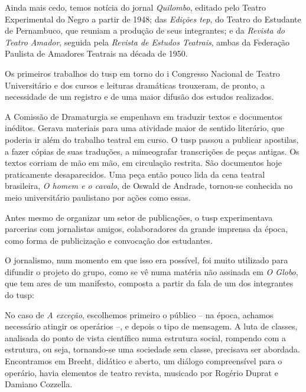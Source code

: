 Ainda mais cedo, temos notícia do jornal {\it Quilombo}, editado pelo
Teatro Experimental do Negro a partir de 1948; das {\it Edições {\sc tep}}, do
Teatro do Estudante de Pernambuco, que reuniam a produção de seus
integrantes; e da {\it Revista do Teatro Amador}, seguida pela
{\it Revista de Estudos Teatrais}, ambas da Federação Paulista de
Amadores Teatrais na década de 1950.

Os primeiros trabalhos do {\sc tusp} em torno do {\sc i} Congresso Nacional de
Teatro Universitário e dos cursos e leituras dramáticas trouxeram, de
pronto, a necessidade de um registro e de uma maior difusão dos estudos
realizados.

A Comissão de Dramaturgia se empenhava em traduzir textos e
documentos inéditos. Gerava materiais para uma atividade maior de
sentido literário, que poderia ir além do trabalho teatral em curso. O
{\sc tusp} passou a publicar apostilas, a fazer cópias de suas traduções, a
mimeografar transcrições de peças antigas. Os textos corriam de mão
em mão, em circulação restrita. São documentos hoje praticamente
desaparecidos. Uma peça então pouco lida da cena teatral brasileira,
{\it O homem e o cavalo}, de Oswald de Andrade, tornou-se conhecida no
meio universitário paulistano por ações como essas.


Antes mesmo de organizar um setor de publicações, o {\sc tusp}
experimentava parcerias com jornalistas amigos, colaboradores da grande
imprensa da época, como forma de publicização e convocação dos
estudantes.

O jornalismo, num momento em que isso era possível, foi muito utilizado
para difundir o projeto do grupo, como se vê numa matéria não assinada
em {\it O Globo}, que tem ares de um manifesto, composta a partir da
fala de um dos integrantes do {\sc tusp}:

\startblockquote
No caso de {\it A exceção}, escolhemos primeiro o público -- na época,
achamos necessário atingir os operários --, e depois o tipo de mensagem.
A luta de classes, analisada do ponto de vista científico numa estrutura
social, rompendo com a estrutura, ou seja, tornando-se uma sociedade sem
classe, precisava ser abordada. Encontramos em Brecht, didático e
aberto, um diálogo compreensível para o operário, havia elementos de
teatro revista, musicado por Rogério Duprat e Damiano Cozzella.

